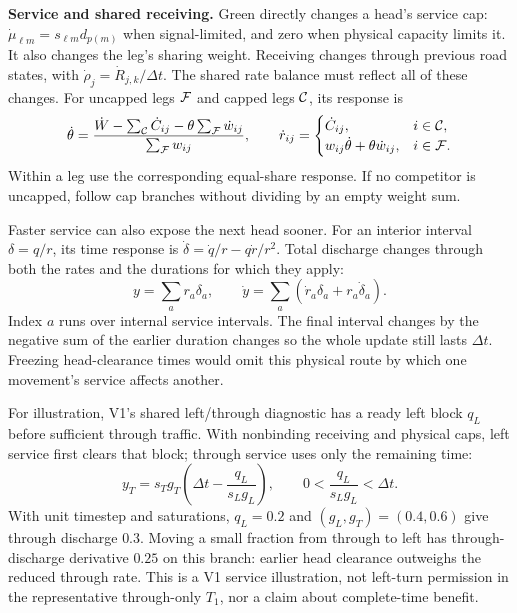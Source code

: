 \documentclass[10pt,a4paper]{article}
\begin{document}
\textbf{Service and shared receiving.} Green directly changes a head's
service cap: $\dot\mu_{\ell m}=s_{\ell m}d_{p(m)}$ when signal-limited,
and zero when physical capacity limits it. It also changes the leg's
sharing weight. Receiving changes through previous road states, with
$\dot\rho_j=\dot R_{j,k}/\Delta t$. The shared rate balance must reflect
all of these changes. For uncapped legs ${\cal F}$ and capped legs
${\cal C}$, its response is
\begin{equation}
 \dot\theta=
 \frac{\dot W-\sum_{\cal C}\dot C_{ij}
               -\theta\sum_{\cal F}\dot w_{ij}}
      {\sum_{\cal F}w_{ij}},\qquad
 \dot r_{ij}=
 \begin{cases}
 \dot C_{ij},&i\in{\cal C},\\
 w_{ij}\dot\theta+\theta\dot w_{ij},&i\in{\cal F}.
 \end{cases}
 \label{eq:compact-sharing-derivative}
\end{equation}
Within a leg use the corresponding equal-share response. If no competitor
is uncapped, follow cap branches without dividing by an empty weight sum.

Faster service can also expose the next head sooner. For an interior
interval $\delta=q/r$, its time response is
$\dot\delta=\dot q/r-q\dot r/r^2$. Total discharge changes through both
the rates and the durations for which they apply:
\begin{equation}
 y=\sum_a r_a\delta_a,\qquad
 \dot y=\sum_a(\dot r_a\delta_a+r_a\dot\delta_a).
 \label{eq:compact-service-derivative}
\end{equation}
Index $a$ runs over internal service intervals. The final interval changes
by the negative sum of the earlier duration changes so the whole update
still lasts $\Delta t$. Freezing head-clearance times would omit this
physical route by which one movement's service affects another.

For illustration, V1's shared left/through diagnostic has a ready left
block $q_L$ before sufficient through traffic. With nonbinding receiving
and physical caps, left service first clears that block; through service
uses only the remaining time:
\begin{equation}
 y_T=s_Tg_T\left(\Delta t-\frac{q_L}{s_Lg_L}\right),
 \qquad 0<\frac{q_L}{s_Lg_L}<\Delta t.
 \label{eq:compact-service}
\end{equation}
With unit timestep and saturations, $q_L=0.2$ and
$(g_L,g_T)=(0.4,0.6)$ give through discharge $0.3$. Moving a small fraction
from through to left has through-discharge derivative $0.25$ on this
branch: earlier head clearance outweighs the reduced through rate.
This is a V1 service illustration, not left-turn permission in the
representative through-only $T_1$, nor a claim about complete-time benefit.
\end{document}
